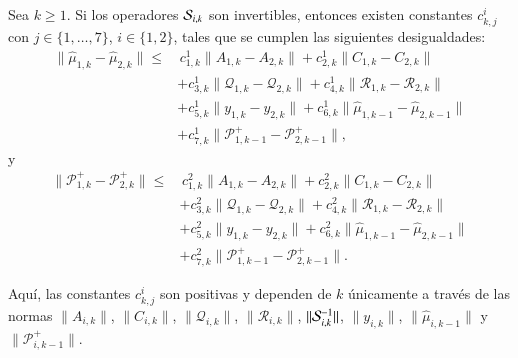 \begin{teo}
	Sea $k \geq 1$. Si los operadores $\S_{i,k}$ son invertibles, entonces existen constantes $c_{k,j}^i$ con $j \in \{1, \dots, 7\}$, $i \in \{1, 2\}$, tales que se cumplen las siguientes desigualdades:
	\begin{equation*}
		\begin{aligned}
			\| \hat{\mu}_{1,k} - \hat{\mu}_{2,k} \| \leq & \, c_{1,k}^1 \| A_{1,k} - A_{2,k} \| + c_{2,k}^1 \| C_{1,k} - C_{2,k} \| \\ 
			&+ c_{3,k}^1 \| \mathcal{Q}_{1,k} - \mathcal{Q}_{2,k} \| + c_{4,k}^1 \| \mathcal{R}_{1,k} - \mathcal{R}_{2,k} \| \\
			&+ c_{5,k}^1 \| y_{1,k} - y_{2,k} \| + c_{6,k}^1 \| \hat{\mu}_{1,k-1} - \hat{\mu}_{2,k-1} \| \\
			&+ c_{7,k}^1 \| \mathcal{P}_{1,k-1}^+ - \mathcal{P}_{2,k-1}^+ \|,
		\end{aligned}
	\end{equation*}
	y
	\begin{equation*}
		\begin{aligned}
			\| \mathcal{P}_{1,k}^+ - \mathcal{P}_{2,k}^+ \| \leq & \, c_{1,k}^2 \| A_{1,k} - A_{2,k} \| + c_{2,k}^2 \| C_{1,k} - C_{2,k} \| \\ 
			&+ c_{3,k}^2 \| \mathcal{Q}_{1,k} - \mathcal{Q}_{2,k} \| + c_{4,k}^2 \| \mathcal{R}_{1,k} - \mathcal{R}_{2,k} \| \\
			&+ c_{5,k}^2 \| y_{1,k} - y_{2,k} \| + c_{6,k}^2 \| \hat{\mu}_{1,k-1} - \hat{\mu}_{2,k-1} \| \\
			&+ c_{7,k}^2 \| \mathcal{P}_{1,k-1}^+ - \mathcal{P}_{2,k-1}^+ \|.
		\end{aligned}
	\end{equation*}

	Aquí, las constantes $c_{k,j}^i$ son positivas y dependen de $k$ únicamente a través de las normas $\| A_{i,k} \|$, $\| C_{i,k} \|$, $\| \mathcal{Q}_{i,k} \|$, $\| \mathcal{R}_{i,k} \|$, $\| \S_{i,k}^{-1} \|$, $\| y_{i,k} \|$, $\| \hat{\mu}_{i,k-1} \|$ y $\| \mathcal{P}_{i,k-1}^+ \|$.
	\label{teo:error_kalman}
\end{teo}


